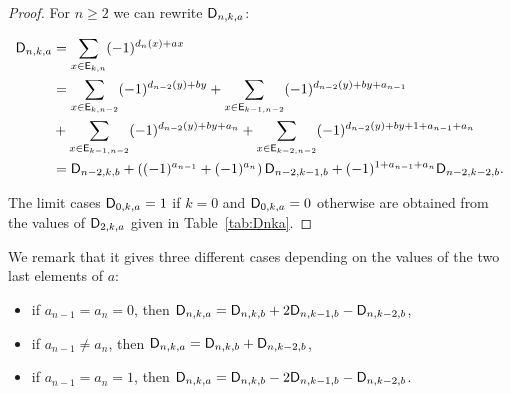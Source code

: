 \documentclass[11pt]{llncs}
\begin{document}
\begin{proof}
For $n\ge 2$ we can rewrite $\mathsf{D}_{n,k,a}$:

\begin{align*}
\mathsf{D}_{n,k,a}&=\sum_{x\in \mathsf{E}_{k,n}} (-1)^{d_n(x) +a x}\\
&=\sum_{x\in \mathsf{E}_{k,n-2}} (-1)^{d_{n-2}(y) +b y}+
\sum_{x\in \mathsf{E}_{k-1,n-2}} (-1)^{d_{n-2}(y) +b y + a_{n-1}}\\
&+\sum_{x\in \mathsf{E}_{k-1,n-2}} (-1)^{d_{n-2}(y) +b y + a_{n}}
+\sum_{x\in \mathsf{E}_{k-2,n-2}} (-1)^{d_{n-2}(y) +b y +1 + a_{n-1}+ a_{n}}\\
&=\mathsf{D}_{n-2,k,b}+\left((-1)^{a_{n-1}} + (-1)^{a_{n}}\right)\mathsf{D}_{n-2,k-1,b} + (-1)^{1+a_{n-1}+a_n} \mathsf{D}_{n-2,k-2,b}.
\end{align*}



The limit cases $\mathsf{D}_{0,k,a}=1$ if $k=0$ and $\mathsf{D}_{0,k,a}=0$ otherwise are obtained from the values of $\mathsf{D}_{2,k,a}$ given in Table~\ref{tab:Dnka}.
\end{proof}








We remark that it gives three different cases depending on the values of the two last elements of $a$:%
\begin{itemize}
	\item if $a_{n-1}=a_n=0$, then $\mathsf{D}_{n,k,a}=\mathsf{D}_{n,k,b}+2\mathsf{D}_{n,k-1,b}-\mathsf{D}_{n,k-2,b}$,
	\item if $a_{n-1} \ne a_n$, then $\mathsf{D}_{n,k,a}=\mathsf{D}_{n,k,b}+\mathsf{D}_{n,k-2,b}$,
	\item if $a_{n-1}=a_n=1$, then $\mathsf{D}_{n,k,a}=\mathsf{D}_{n,k,b}-2\mathsf{D}_{n,k-1,b}-\mathsf{D}_{n,k-2,b}$.
\end{itemize}

\end{document}
